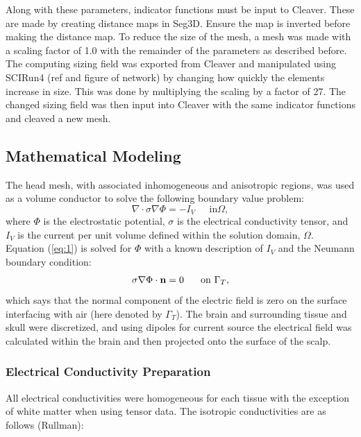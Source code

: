  Along with these parameters, indicator functions must be input to Cleaver. These are made by creating distance maps in Seg3D. Ensure the map is inverted before making the distance map. To reduce the size of the mesh, a mesh was made with a scaling factor of 1.0 with the remainder of the parameters as described before. The computing sizing field was exported from Cleaver and manipulated using SCIRun4 (ref and figure of network) by changing how quickly the elements increase in size. This was done by multiplying the scaling by a factor of 27. The changed sizing field was then input into Cleaver with the same indicator functions and cleaved a new mesh.

\subsection{Mathematical Modeling}
\label{sec:math}


The head mesh, with associated inhomogeneous and anisotropic regions, was used as a volume conductor to solve the following boundary value problem:
%
\begin{equation}
\label{eq:1} \nabla\cdot\sigma\nabla\Phi = -I_{V} \;\;\;\;\mbox{ in
}\Omega,
\end{equation} 
%
where $\Phi$ is the electrostatic potential, $\sigma$ is the electrical conductivity tensor, and $I_{V}$ is the current per unit volume defined within the solution domain, $\Omega$. Equation (\ref{eq:1}) is solved for $\Phi$ with a known description of $I_{V}$ and the Neumann boundary condition:
%
\begin{equation} \sigma\nabla\Phi\cdot{\bf
n} = 0\;\;\;\;\;\mbox{ on }\Gamma_{T}, 
\end{equation} 
%
which says that the normal component of the electric field is zero on the surface interfacing with air (here denoted by $\Gamma_{T}$). The brain and surrounding tissue and skull were discretized, and using dipoles for current source the electrical field was calculated within the brain and then projected onto the surface of the scalp.

\subsubsection{Electrical Conductivity Preparation}
\label{sec:cond}

All electrical conductivities were homogeneous for each tissue with the exception of white matter when using tensor data. The isotropic conductivities are as follows (Rullman): 

